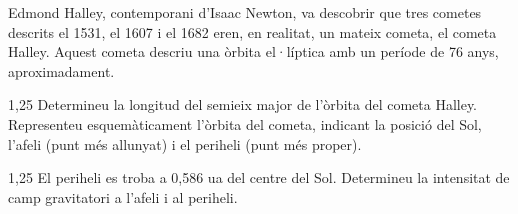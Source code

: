 Edmond Halley, contemporani d'Isaac Newton, va descobrir que tres cometes descrits el 1531, el 1607 i el 1682 eren, en realitat, un mateix cometa, el cometa Halley. Aquest cometa descriu una òrbita el·líptica amb un període de 76 anys, aproximadament.

\begin{apartat}{1,25}
Determineu la longitud del semieix major de l'òrbita del cometa Halley. Representeu esquemàticament l'òrbita del cometa, indicant la posició del Sol, l'afeli (punt més allunyat) i el periheli (punt més proper).
\end{apartat}

\begin{apartat}{1,25}
El periheli es troba a 0,586 ua del centre del Sol. Determineu la intensitat de camp gravitatori a l'afeli i al periheli.
\end{apartat}

